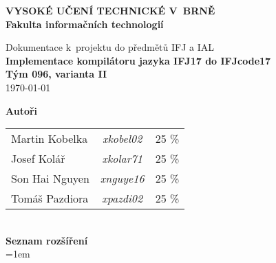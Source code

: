 \begin{titlepage}
    \centering

    {\fontsize{20pt}{15pt}\bfseries
    VYSOKÉ UČENÍ TECHNICKÉ V~BRNĚ\\
    \vspace{8pt}
    Fakulta informačních technologií
    }

    \vspace*{64pt}

    
    \vspace*{22pt}

    {\Large Dokumentace k~projektu do předmětů IFJ a IAL\\}
    \vspace*{18pt}
    {\LARGE \bfseries Implementace kompilátoru jazyka IFJ17 do IFJcode17\\}
    \vspace*{62pt}
    {\Large \bfseries Tým 096, varianta II\\}
    \vspace*{42pt}
    {\Large \today}

    \vspace*{64pt}
    {\Large \bfseries Autoři\\}
    \vspace*{8pt}
    \begin{tabular}{ l c r }
        Martin Kobelka & \textit{xkobel02} & 25 \% \\
        Josef Kolář & \textit{xkolar71} & 25 \% \\
        Son Hai Nguyen & \textit{xnguye16} & 25 \% \\
        Tomáš Pazdiora & \textit{xpazdi02} & 25 \% \\
    \end{tabular}\\
    \vspace*{92pt}
    {\Large \bfseries Seznam rozšíření\\}
    \vspace*{18pt}
    {\spaceskip=1em }\\ %

\end{titlepage}
